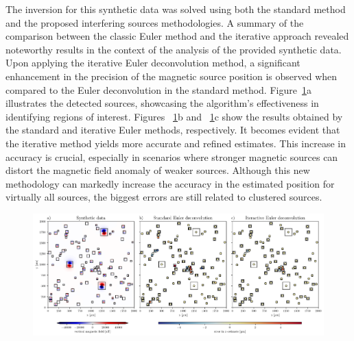 The inversion for this synthetic data was solved using both the standard method \citep{Souza-Junior2023b} and the proposed interfering sources methodologies. A summary of the comparison between the classic Euler method and the iterative approach revealed noteworthy results in the context of the analysis of the provided synthetic data. Upon applying the iterative Euler deconvolution method, a significant enhancement in the precision of the magnetic source position is observed when compared to the Euler deconvolution in the standard method. Figure~\ref{euler1}a illustrates the detected sources, showcasing the algorithm's effectiveness in identifying regions of interest. Figures ~\ref{euler1}b and ~\ref{euler1}c show the results obtained by the standard and iterative Euler methods, respectively. It becomes evident that the iterative method yields more accurate and refined estimates. This increase in accuracy is crucial, especially in scenarios where stronger magnetic sources can distort the magnetic field anomaly of weaker sources. Although this new methodology can markedly increase the accuracy in the estimated position for virtually all sources, the biggest errors are still related to clustered sources.

\begin{figure}[tb!]
  \centering
  \includegraphics[width=1\linewidth]{figures/euler-comparion-1.png}
  \caption{
      }
  \label{euler1}
\end{figure}

